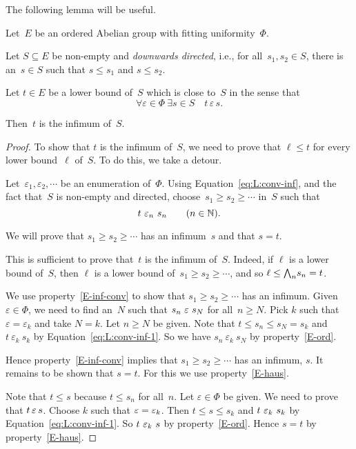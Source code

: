 \documentclass[main.tex]{subfiles}
\begin{document}
%
%
The following lemma will be useful.
\begin{lem}
\label{lem:conv-inf}
Let~$E$ be an ordered Abelian group with 
fitting uniformity~$\Phi$.

Let $S\subseteq E$
be non-empty and \emph{downwards directed},
i.e., for all~$s_1,s_2\in S$,
there is an~$s\in S$ such that $s\leq s_1$
and $s\leq s_2$.

Let $t\in E$ be a lower bound of~$S$
which is close to~$S$ in the sense that
\begin{equation}
\label{eq:L:conv-inf}
\forall\varepsilon\in\Phi\ \exists s\in S\quad t\,\varepsilon\, s\text{.}
\end{equation}

Then~$t$ is the infimum of~$S$.
\end{lem}
\begin{proof}
To show that $t$ is the infimum of~$S$,
we need to prove that $\ell \leq t$
for every lower bound~$\ell$ of~$S$.
To do this, we take a detour.

Let~$\varepsilon_1,\varepsilon_2,\dotsb$
be an enumeration of~$\Phi$.
Using Equation~\eqref{eq:L:conv-inf},
and the fact that~$S$ is non-empty and directed,
choose~$s_1 \geq s_2 \geq \dotsb$ in~$S$
such that 
\begin{equation}
\label{eq:L:conv-inf-1}
t\ \varepsilon_n \ s_n\qquad(n\in \mathbb{N}).
\end{equation}

We will prove that
$s_1 \geq s_2 \geq \dotsb$
has an infimum~$s$ and that $s=t$.

This is sufficient to prove that~$t$ is the infimum of~$S$.
Indeed,
if $\ell$ is a lower bound of~$S$,
then $\ell$ is a lower bound of~$s_1 \geq s_2 \geq\dotsb$,
and so $\ell \leq \textstyle{\bigwedge}_n s_n =t$.

We use property~\ref{E-inf-conv}
to show that $s_1 \geq s_2 \geq\dotsb$
has an infimum.
Given $\varepsilon\in\Phi$,
we need to find an~$N$ such that $s_n \ \varepsilon\ s_N$
for all~$n\geq N$. Pick $k$ such that $\varepsilon=\varepsilon_k$
and take $N=k$. Let $n\geq N$ be given.
Note that $t \leq s_n \leq s_N =s_k$
and $t\ \varepsilon_k\ s_k$
by Equation~\eqref{eq:L:conv-inf-1}.
So we have $s_n\ \varepsilon_k\ s_N$ by property~\ref{E-ord}.

Hence property~\ref{E-inf-conv} implies that $s_1 \geq s_2 \geq \dotsb$
has an infimum, $s$.
It remains to be shown that $s=t$.
For this we use property~\ref{E-haus}.

Note that $t\leq s$ because $t\leq s_n$ for all~$n$.
Let $\varepsilon\in\Phi$ be given.
We need to prove that $t \,\varepsilon\, s$.
Choose $k$ such that $\varepsilon = \varepsilon_k$.
Then $t \leq s \leq s_k$
and $t \ \varepsilon_k\ s_k$
by Equation~\eqref{eq:L:conv-inf-1}.
So $t\ \varepsilon_k \  s$ by property~\ref{E-ord}.
Hence $s=t$ by property~\ref{E-haus}.
\end{proof}
%
%
\end{document}

